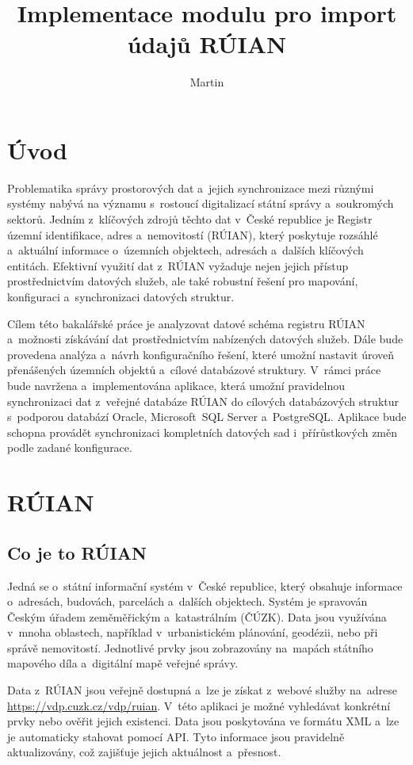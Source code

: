 \documentclass[czech, kiv, ba, he, iso690auyr, pdf]{fasthesis}
\title{Implementace modulu pro import údajů RÚIAN}
\author{Martin}{Schön}{}{}
\begin{document}
\frontpages[tm]
\tableofcontents
\chapter{Úvod}
Problematika správy prostorových dat a~jejich synchronizace mezi různými systémy 
nabývá na významu s~rostoucí digitalizací státní správy a~soukromých sektorů. 
Jedním z~klíčových zdrojů těchto dat v~České republice je Registr územní identifikace, 
adres a~nemovitostí (RÚIAN), který poskytuje rozsáhlé a~aktuální informace o~územních 
objektech, adresách a~dalších klíčových entitách. Efektivní využití dat z~RÚIAN vyžaduje 
nejen jejich přístup prostřednictvím datových služeb, ale také robustní řešení pro mapování, 
konfiguraci a~synchronizaci datových struktur.

Cílem této bakalářské práce je analyzovat datové schéma registru RÚIAN a~možnosti získávání 
dat prostřednictvím nabízených datových služeb. Dále bude provedena analýza a~návrh konfiguračního 
řešení, které umožní nastavit úroveň přenášených územních objektů a~cílové databázové struktury. 
V~rámci práce bude navržena a~implementována aplikace, která umožní pravidelnou synchronizaci dat 
z~veřejné databáze RÚIAN do cílových databázových struktur s~podporou databází Oracle, 
Microsoft~SQL Server a~PostgreSQL. Aplikace bude schopna provádět synchronizaci kompletních datových 
sad i~přírůstkových změn podle zadané konfigurace.

\chapter{RÚIAN}
\section{Co je to RÚIAN}
Jedná se o~státní informační systém v~České republice, který obsahuje 
informace o~adresách, budovách, parcelách a~dalších objektech. Systém 
je spravován Českým úřadem zeměměřickým a~katastrálním (ČÚZK). 
Data jsou využívána v~mnoha oblastech, například v~urbanistickém plánování, 
geodézii, nebo při správě nemovitostí. Jednotlivé prvky jsou zobrazovány na~mapách 
státního mapového díla a~digitální mapě veřejné správy. 

Data z~RÚIAN jsou veřejně dostupná a~lze je získat z~webové služby na~adrese 
\url{https://vdp.cuzk.cz/vdp/ruian}. V~této aplikaci je možné vyhledávat konkrétní 
prvky nebo ověřit jejich existenci. Data jsou poskytována ve formátu XML a~lze je 
automaticky stahovat pomocí API. Tyto informace jsou pravidelně aktualizovány, 
což zajišťuje jejich aktuálnost a~přesnost.
\end{document}
